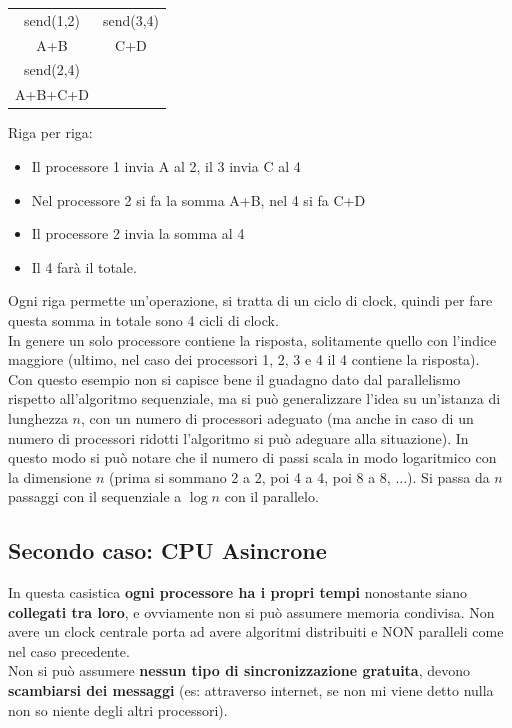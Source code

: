 \begin{tabular}{c c}
	send(1,2) & send(3,4) \\
	A+B & C+D \\
	send(2,4) & \\
	A+B+C+D &
\end{tabular}

\newpage

Riga per riga: 
\begin{itemize}
	\item Il processore 1 invia A al 2, il 3 invia C al 4
	\item Nel processore 2 si fa la somma A+B, nel 4 si fa C+D
	\item Il processore 2 invia la somma al 4 
	\item Il 4 farà il totale.
\end{itemize}

Ogni riga permette un'operazione, si tratta di un ciclo di clock, quindi per fare questa somma in totale sono 4 cicli di clock. \\

In genere un solo processore contiene la risposta, solitamente quello con l'indice maggiore (ultimo, nel caso dei processori 1, 2, 3 e 4 il 4 contiene la risposta). \\

Con questo esempio non si capisce bene il guadagno dato dal parallelismo rispetto all'algoritmo sequenziale, ma si può generalizzare l'idea su un'istanza di lunghezza $n$, con un numero di processori adeguato (ma anche in caso di un numero di processori ridotti l'algoritmo si può adeguare alla situazione). In questo modo si può notare che il numero di passi scala in modo logaritmico con la dimensione $n$ (prima si sommano 2 a 2, poi 4 a 4, poi 8 a 8, ...). Si passa da $n$ passaggi con il sequenziale a $\log n$ con il parallelo. \\

\newpage

\subsection*{Secondo caso: CPU Asincrone}
In questa casistica \textbf{ogni processore ha i propri tempi} nonostante siano \textbf{collegati tra loro}, e ovviamente non si può assumere memoria condivisa. Non avere un clock centrale porta ad avere algoritmi distribuiti e NON paralleli come nel caso precedente.\\
Non si può assumere \textbf{nessun tipo di sincronizzazione gratuita}, devono \textbf{scambiarsi dei messaggi} (es: attraverso internet, se non mi viene detto nulla non so niente degli altri processori).\\

